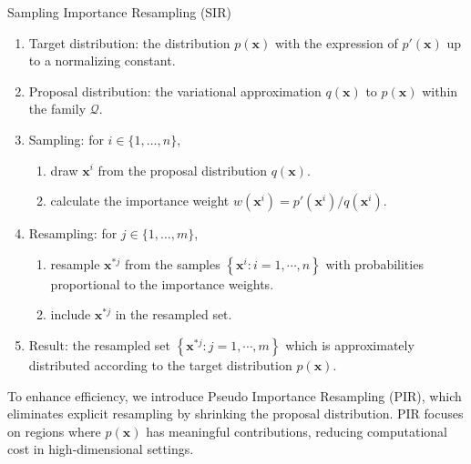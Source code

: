 \documentclass[pdflatex,sn-mathphys-num]{sn-jnl}%
\theoremstyle{thmstyleone}%
\theoremstyle{thmstyletwo}%
\theoremstyle{thmstylethree}%
\begin{document}
\begin{algorithm}
\caption{Sampling Importance Resampling (SIR)}
\label{alg:variational_sir}
\begin{enumerate}
    \item Target distribution: the distribution $p\left(\mathbf{x}\right)$ with the expression of \(p'\left(\mathbf{x}\right)\) up to a normalizing constant.
    \item Proposal distribution: the variational approximation \( q\left(\mathbf{x}\right) \) to \( p\left(\mathbf{x}\right) \) within the family $\mathcal{Q}$.
    \item Sampling: for \( i \in \{1, \dots, n\} \),
    \begin{enumerate}
        \item draw \( \mathbf{x}^{i} \) from the proposal distribution \( q\left(\mathbf{x}\right) \).
        \item calculate the importance weight \( w\left(\mathbf{x}^{i}\right) = p'\left(\mathbf{x}^{i}\right) / q\left(\mathbf{x}^{i}\right) \).
    \end{enumerate}
    \item Resampling: for \( j \in \{1, \dots, m\} \),
    \begin{enumerate}
        \item resample \( \mathbf{x}^{*j} \) from the samples $\left\{\mathbf{x}^{i}: i=1,\cdots,n\right\}$ with probabilities proportional to the importance weights.
        \item include \( \mathbf{x}^{*j} \) in the resampled set.
    \end{enumerate}
    \item Result: the resampled set $\left\{\mathbf{x}^{*j}: j=1,\cdots,m\right\}$ which is approximately distributed according to the target distribution $p\left(\mathbf{x}\right)$.
\end{enumerate}
\end{algorithm}

To enhance efficiency, we introduce Pseudo Importance Resampling (PIR), which eliminates explicit resampling by shrinking the proposal distribution. PIR focuses on regions where $p\left(\mathbf{x}\right)$ has meaningful contributions, reducing computational cost in high-dimensional settings.
\end{document}
